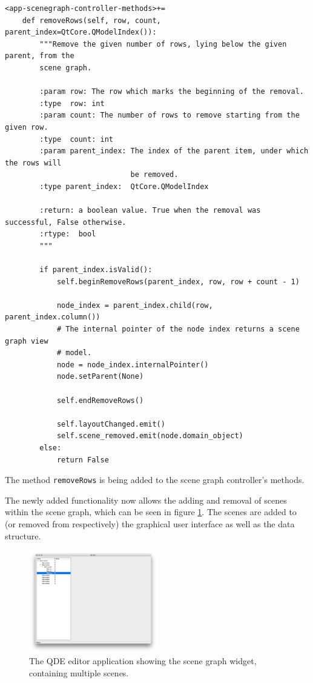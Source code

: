 \documentclass[10pt, openright, notitlepage]{scrreprt}
\begin{document}
\begin{listing}[H]
\begin{verbatim}
<app-scenegraph-controller-methods>+=
    def removeRows(self, row, count, parent_index=QtCore.QModelIndex()):
        """Remove the given number of rows, lying below the given parent, from the
        scene graph.
    
        :param row: The row which marks the beginning of the removal.
        :type  row: int
        :param count: The number of rows to remove starting from the given row.
        :type  count: int
        :param parent_index: The index of the parent item, under which the rows will
                             be removed.
        :type parent_index:  QtCore.QModelIndex
    
        :return: a boolean value. True when the removal was successful, False otherwise.
        :rtype:  bool
        """
    
        if parent_index.isValid():
            self.beginRemoveRows(parent_index, row, row + count - 1)
    
            node_index = parent_index.child(row, parent_index.column())
            # The internal pointer of the node index returns a scene graph view
            # model.
            node = node_index.internalPointer()
            node.setParent(None)
    
            self.endRemoveRows()
    
            self.layoutChanged.emit()
            self.scene_removed.emit(node.domain_object)
        else:
            return False
\end{verbatim}
\caption{\label{lst:app-scenegraph-controller-methods-remove-rows}
The method \texttt{removeRows} is being added to the scene graph controller's methods.}
\end{listing}

The newly added functionality now allows the adding and removal of scenes within
the scene graph, which can be seen in figure \ref{fig:editor-alpha-04}. The scenes are
added to (or removed from respectively) the graphical user interface as well as
the data structure.

\begin{figure}[H]
\centering
\includegraphics[width=0.5\textwidth]{./images/qde_alpha_05.png}
\caption{\label{fig:editor-alpha-04}
The QDE editor application showing the scene graph widget, containing multiple scenes.}
\end{figure}
\end{document}
